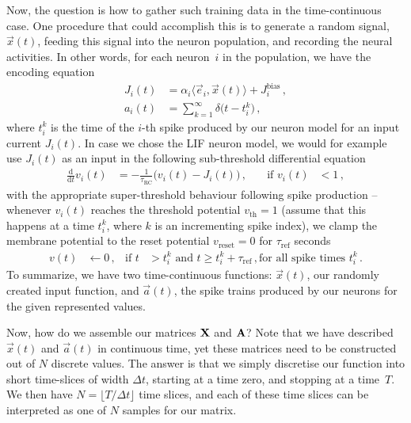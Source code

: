 \documentclass[10pt,letterpaper,oneside]{article}
\begin{document}
Now, the question is how to gather such training data in the time-continuous case. One procedure that could accomplish this is to generate a random signal, $\vec x(t)$, feeding this signal into the neuron population, and recording the neural activities. In other words, for each neuron~$i$ in the population, we have the encoding equation
\begin{align*}
J_i(t) &= \alpha_i \langle \vec e_i, \vec x(t) \rangle + J^\mathrm{bias}_i \,, \\
a_i(t) &= \sum_{k=1}^\infty \delta\big(t - t^k_i\big) \,,
\end{align*}
where $t^k_i$ is the time of the $i$-th spike produced by our neuron model for an input current $J_i(t)$. In case we chose the LIF neuron model, we would for example use $J_i(t)$ as an input in the following sub-threshold differential equation
\begin{align*}
\frac{\mathrm{d}}{\mathrm{d}t} v_i(t) &= -\frac{1}{\tau_\mathrm{RC}} \big( v_i(t) - J_i(t) \big) \,, \quad &\text{if } v_i(t) &< 1\,,
\end{align*}
with the appropriate super-threshold behaviour following spike production -- whenever $v_i(t)$ reaches the threshold potential $v_\mathrm{th} = 1$ (assume that this happens at a time $t_i^k$, where $k$ is an incrementing spike index), we clamp the membrane potential to the reset potential $v_\mathrm{reset} = 0$ for $\tau_\mathrm{ref}$ seconds
\begin{align*}
v(t) &\gets 0 \,, &\text{if } t &> t_i^k \text{ and } t \geq t_i^k + \tau_\mathrm{ref} \,, \text{for all spike times } t_i^k \,.
\end{align*}
To summarize, we have two time-continuous functions: $\vec x(t)$, our randomly created input function, and $\vec a(t)$, the spike trains produced by our neurons for the given represented values.

Now, how do we assemble our matrices ${\mathbf{X}}$ and ${\mathbf{A}}$? Note that we have described $\vec x(t)$ and $\vec a(t)$ in continuous time, yet these matrices need to be constructed out of $N$ discrete values. The answer is that we simply discretise our function into short time-slices of width $\Delta t$, starting at a time zero, and stopping at a time~$T$. We then have $N = \lfloor T / \Delta t \rfloor$ time slices, and each of these time slices can be interpreted as one of $N$ samples for our matrix.
\end{document}
